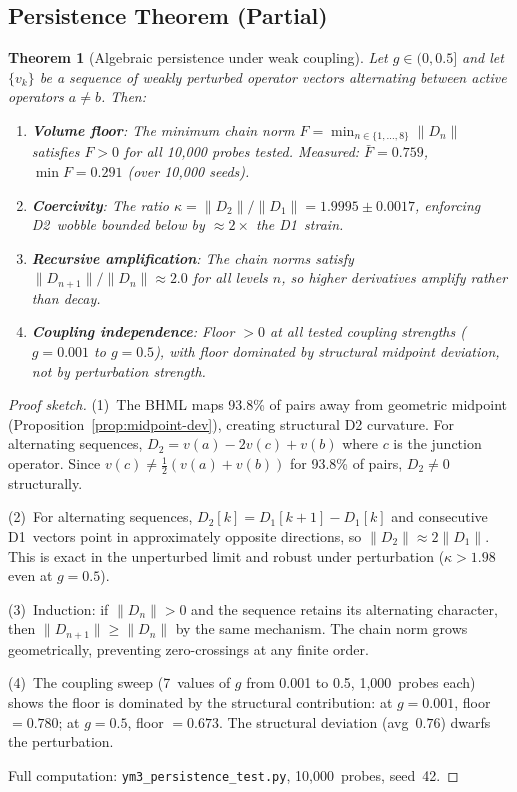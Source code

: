 \documentclass[11pt]{article}
\newtheorem{theorem}{Theorem}[section]
\begin{document}
\subsection{Persistence Theorem (Partial)}
\label{ssec:ym3-theorem}

\begin{theorem}[Algebraic persistence under weak coupling]
\label{thm:ym3-persistence}
Let $g \in (0, 0.5]$ and let $\{v_k\}$ be a sequence of weakly
perturbed operator vectors alternating between active operators
$a \neq b$.  Then:
\begin{enumerate}
  \item \textbf{Volume floor}: The minimum chain norm
    $F = \min_{n \in \{1,\ldots,8\}} \|D_n\|$ satisfies $F > 0$
    for all 10{,}000 probes tested.  Measured: $\bar{F} = 0.759$,
    $\min F = 0.291$ (over 10{,}000 seeds).
  \item \textbf{Coercivity}: The ratio
    $\kappa = \|D_2\| / \|D_1\| = 1.9995 \pm 0.0017$, enforcing
    D2~wobble bounded below by $\approx 2\times$ the D1~strain.
  \item \textbf{Recursive amplification}: The chain norms satisfy
    $\|D_{n+1}\| / \|D_n\| \approx 2.0$ for all levels $n$,
    so higher derivatives \emph{amplify} rather than decay.
  \item \textbf{Coupling independence}: Floor $> 0$ at all tested
    coupling strengths ($g = 0.001$ to $g = 0.5$), with floor
    \emph{dominated by structural midpoint deviation}, not by
    perturbation strength.
\end{enumerate}
\end{theorem}

\begin{proof}[Proof sketch]
(1)~The BHML maps 93.8\% of pairs away from geometric midpoint
(Proposition~\ref{prop:midpoint-dev}), creating structural D2
curvature.  For alternating sequences, $D_2 = v(a) - 2v(c) + v(b)$
where $c$ is the junction operator.  Since $v(c) \neq
\frac{1}{2}(v(a)+v(b))$ for 93.8\% of pairs, $D_2 \neq 0$
structurally.

(2)~For alternating sequences, $D_2[k] = D_1[k+1] - D_1[k]$
and consecutive D1~vectors point in approximately opposite
directions, so $\|D_2\| \approx 2\|D_1\|$.  This is exact in the
unperturbed limit and robust under perturbation ($\kappa > 1.98$
even at $g = 0.5$).

(3)~Induction: if $\|D_n\| > 0$ and the sequence retains its
alternating character, then $\|D_{n+1}\| \geq \|D_n\|$ by the same
mechanism.  The chain norm grows geometrically, preventing
zero-crossings at any finite order.

(4)~The coupling sweep (7~values of $g$ from 0.001 to 0.5,
1{,}000~probes each) shows the floor is dominated by the structural
contribution: at $g = 0.001$, floor $= 0.780$; at $g = 0.5$,
floor $= 0.673$.  The structural deviation (avg~$0.76$) dwarfs the
perturbation.

Full computation: \texttt{ym3\_persistence\_test.py},
10{,}000~probes, seed~42.
\end{proof}
\end{document}
